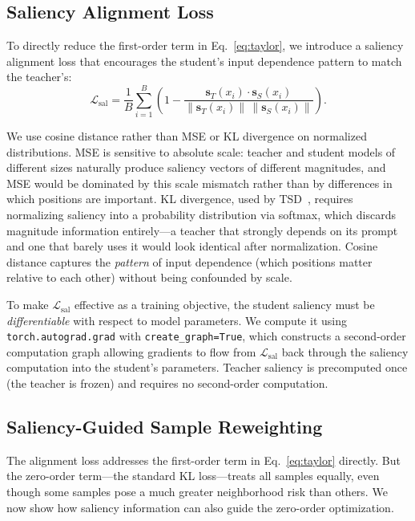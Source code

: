 \subsection{Saliency Alignment Loss}\label{sec:sagd-loss}

To directly reduce the first-order term in Eq.~\eqref{eq:taylor}, we introduce a saliency alignment loss that encourages the student's input dependence pattern to match the teacher's:
\begin{equation}\label{eq:sal-loss}
\mathcal{L}_\mathrm{sal} = \frac{1}{B} \sum_{i=1}^{B} \left(1 - \frac{\mathbf{s}_T(x_i) \cdot \mathbf{s}_S(x_i)}{\|\mathbf{s}_T(x_i)\| \, \|\mathbf{s}_S(x_i)\|}\right).
\end{equation}

We use cosine distance rather than MSE or KL divergence on normalized distributions. MSE is sensitive to absolute scale: teacher and student models of different sizes naturally produce saliency vectors of different magnitudes, and MSE would be dominated by this scale mismatch rather than by differences in which positions are important. KL divergence, used by TSD~\citep{dehigahawattage2026learning}, requires normalizing saliency into a probability distribution via softmax, which discards magnitude information entirely---a teacher that strongly depends on its prompt and one that barely uses it would look identical after normalization. Cosine distance captures the \emph{pattern} of input dependence (which positions matter relative to each other) without being confounded by scale.

To make $\mathcal{L}_\mathrm{sal}$ effective as a training objective, the student saliency must be \emph{differentiable} with respect to model parameters. We compute it using \texttt{torch.autograd.grad} with \texttt{create\_graph=True}, which constructs a second-order computation graph allowing gradients to flow from $\mathcal{L}_\mathrm{sal}$ back through the saliency computation into the student's parameters. Teacher saliency is precomputed once (the teacher is frozen) and requires no second-order computation.


\subsection{Saliency-Guided Sample Reweighting}\label{sec:sagd-reweight}

The alignment loss addresses the first-order term in Eq.~\eqref{eq:taylor} directly. But the zero-order term---the standard KL loss---treats all samples equally, even though some samples pose a much greater neighborhood risk than others. We now show how saliency information can also guide the zero-order optimization.

